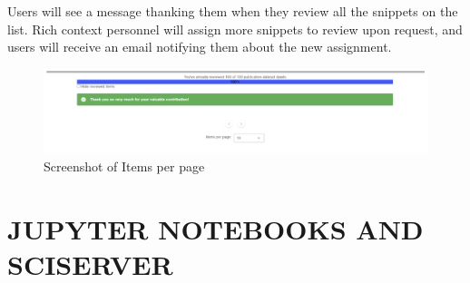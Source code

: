 \documentclass[titlepage, 11pt]{article}
\begin{document}
{Users will see a message thanking them when they review all the snippets on the list. Rich context personnel will assign more snippets to review upon request, and users will receive an email notifying them about the new assignment.

\begin{figure}
  \includegraphics[scale=0.40]{items_per_page.png}
  \caption{Screenshot of Items per page}
  \label{fig:items_per_page}
\end{figure}

\section{JUPYTER NOTEBOOKS AND SCISERVER}
\label{sec:Chapter7}

}
\end{document}
